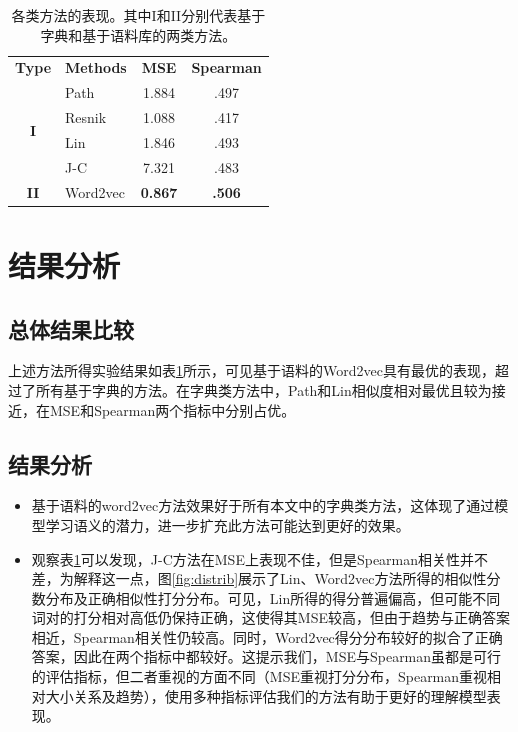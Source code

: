 \documentclass{article}
\begin{document}
\begin{table}[h]
  \centering
  \begin{tabular}{c l c c}
    \toprule
    \bfseries Type & \bfseries Methods & \bfseries MSE & \bfseries Spearman\\
    \cmidrule(lr){1-4}
    \multirow{4}{*}{\bfseries I} &
    Path  & 1.884 & .497 \\
    & Resnik & 1.088 & .417 \\
    & Lin & 1.846 & .493 \\
    & J-C & 7.321 & .483 \\
    \cmidrule(lr){1-4}
    \multirow{1}{*}{\bfseries II} &
    Word2vec & \bfseries 0.867 & \bfseries .506 \\
    \bottomrule
\end{tabular}
  \caption{各类方法的表现。其中I和II分别代表基于字典和基于语料库的两类方法。}
  \label{tab:overall_eval}
\end{table}

\section{结果分析}
\subsection{总体结果比较}
上述方法所得实验结果如表\ref{tab:overall_eval}所示，可见基于语料的Word2vec具有最优的表现，超过了所有基于字典的方法。在字典类方法中，Path和Lin相似度相对最优且较为接近，在MSE和Spearman两个指标中分别占优。

\subsection{结果分析}
\begin{itemize}
  \item 基于语料的word2vec方法效果好于所有本文中的字典类方法，这体现了通过模型学习语义的潜力，进一步扩充此方法可能达到更好的效果。
  \item 观察表\ref{tab:overall_eval}可以发现，J-C方法在MSE上表现不佳，但是Spearman相关性并不差，为解释这一点，图\ref{fig:distrib}展示了Lin、Word2vec方法所得的相似性分数分布及正确相似性打分分布。可见，Lin所得的得分普遍偏高，但可能不同词对的打分相对高低仍保持正确，这使得其MSE较高，但由于趋势与正确答案相近，Spearman相关性仍较高。同时，Word2vec得分分布较好的拟合了正确答案，因此在两个指标中都较好。这提示我们，MSE与Spearman虽都是可行的评估指标，但二者重视的方面不同（MSE重视打分分布，Spearman重视相对大小关系及趋势），使用多种指标评估我们的方法有助于更好的理解模型表现。
\end{itemize}
\end{document}
